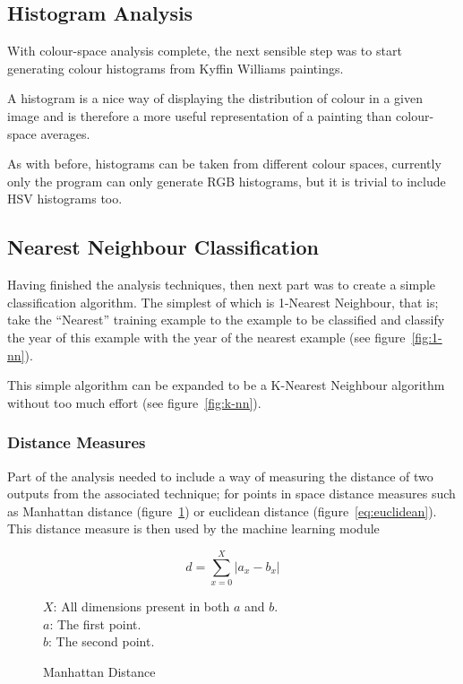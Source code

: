 \documentclass[11pt,fleqn,twoside]{article}
\begin{document}
\subsection{Histogram Analysis}
With colour-space analysis complete, the next sensible step was to start generating colour 
histograms from Kyffin Williams paintings.

A histogram is a nice way of displaying the distribution of colour in a given image and is 
therefore a more useful representation of a painting than colour-space averages.

As with before, histograms can be taken from different colour spaces, currently only the program
can only generate RGB histograms, but it is trivial to include HSV histograms too.

\subsection{Nearest Neighbour Classification}
Having finished the analysis techniques, then next part was to create a simple classification 
algorithm. The simplest of which is 1-Nearest Neighbour, that is; take the ``Nearest'' training
example to the example to be classified and classify the year of this example with the year of the
nearest example (see figure~\ref{fig:1-nn}).

This simple algorithm can be expanded to be a K-Nearest Neighbour algorithm without too much effort
(see figure~\ref{fig:k-nn}). 


\subsubsection{Distance Measures}
Part of the analysis needed to include a way of measuring the distance of two outputs from the
associated technique; for points in space distance measures such as Manhattan distance 
(figure~\ref{eq:manhattan}) or euclidean distance (figure~\ref{eq:euclidean}). This distance 
measure is then used by the machine learning module

\begin{figure}[p]
\[
d = \sum^X_{x=0}{|a_x - b_x|}
\]

\(X\): All dimensions present in both \(a\) and \(b\).\\
\(a\): The first point.\\
\(b\): The second point.

\caption{Manhattan Distance}
\label{eq:manhattan}
\end{figure}
\end{document}

